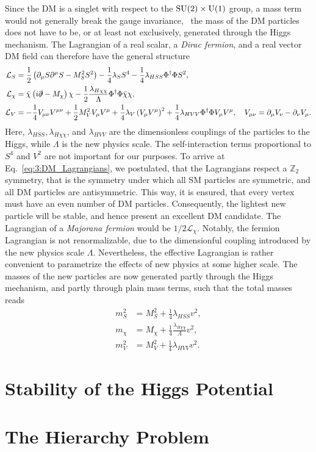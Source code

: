 Since the \acs{DM} is a singlet with respect to the $\mathrm{SU}(2) \times \mathrm{U}(1)$ group, a mass term would not generally break the gauge invariance, \ie\ the mass of the \acs{DM} particles does not have to be, or at least not exclusively, generated through the Higgs mechanism. The Lagrangian of a real scalar, a \textit{Dirac fermion}, and a real vector \acs{DM} field can therefore have the general structure
\begin{equation}
\begin{split}
\mathcal{L}_S &= \frac{1}{2} \left(\partial_\mu S \partial^\mu S - M_S^2 S^2 \right)  - \frac{1}{4} \lambda_S S^4 - \frac{1}{4} \lambda_{HSS} \Phi^\dagger \Phi S^2 , \\
\mathcal{L}_\chi &=  \bar{\chi} \left(i \slashed{\partial} - M_\chi \right) \chi - \frac{1}{2} \frac{\lambda_{H\chi \chi}}{\Lambda} \Phi^\dagger \Phi \bar{\chi} \chi, \\
\mathcal{L}_V &=  - \frac{1}{4} V_{\mu \nu} V^{\mu \nu} + \frac{1}{2} M_V^2 V_\mu V^\mu + \frac{1}{4} \lambda_V \left(V_\mu V^\mu \right)^2 + \frac{1}{4} \lambda_{HVV} \Phi^\dagger \Phi V_\mu V^\mu, \quad V_{\mu \nu} = \partial_\mu V_\nu - \partial_\nu V_\mu.
\end{split}
\label{eq:3:DM_Lagrangians}
\end{equation}
Here, $\lambda_{HSS}, \lambda_{H\chi\chi}$, and $\lambda_{HVV}$ are the dimensionless couplings of the particles to the Higgs, while $\Lambda$ is the new physics scale. The self-interaction terms proportional to $S^4$ and $V^2$ are not important for our purposes. To arrive at Eq.~\eqref{eq:3:DM_Lagrangians}, we postulated, that the Lagrangians respect a $\mathbb{Z}_2$ symmetry, that is the symmetry under which all \acs{SM} particles are symmetric, and all \acs{DM} particles are antisymmetric. This way, it is ensured, that every vertex must have an even number of \acs{DM} particles. Consequently, the lightest new particle will be stable, and hence present an excellent \acs{DM} candidate. The Lagrangian of a \textit{Majorana fermion} would be $1/2 \mathcal{L}_\chi$. Notably, the fermion Lagrangian is not renormalizable, due to the dimensionful coupling introduced by the new physics scale $\Lambda$. Nevertheless, the effective Lagrangian is rather convenient to parametrize the effects of new physics at some higher scale. The masses of the new particles are now generated partly through the Higgs mechanism, and partly through plain mass terms, such that the total masses reads
\begin{equation}
\begin{split}
m_S^2 &= M_S^2 + \frac{1}{4} \lambda_{HSS} v^2, \\
m_\chi &= M_\chi + \frac{1}{4} \frac{\lambda_{H\chi\chi}}{\Lambda} v^2, \\
m_V^2 &= M_V^2 + \frac{1}{4} \lambda_{HVV} v^2.
\end{split}
\end{equation}


\section{Stability of the Higgs Potential}

\section{The Hierarchy Problem}
